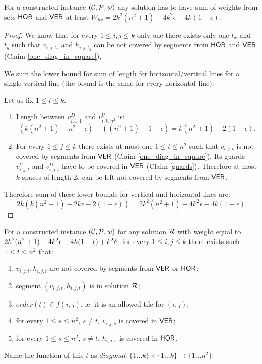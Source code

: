 \begin{lemma}
\label{vertical_horizontal_sum}
For a constructed instance $(\mathcal{C}, \mathcal{P}, w)$
any solution has to have sum of weights from sets $\mathsf{HOR}$ and $\mathsf{VER}$ at least
$W_{hv} = 2k^2(n^2+1) -4k^2\epsilon -4k(1-\epsilon)$.
\end{lemma}

\begin{proof}
We know that for every $1 \le i,j \le k$
only one there exists only one $t_x$ and $t_y$ such that
$v_{i,j,t_x}$ and $h_{i,j,t_y}$
can be not covered by
segments from $\mathsf{HOR}$ and $\mathsf{VER}$ (Claim \ref{one_diag_in_square}),


We sum the lower bound for sum of length for horizontal/vertical
lines for a single vertical line
(the bound is the same for every horizontal line).

Let us fix $1 \le i \le k$.

\begin{enumerate}[label={(\arabic*)}]
\item Length between $v^D_{i, 1, 1}$ and $v^U_{i, k, n^2}$ is:
$$(k(n^2+1) + n^2 +\epsilon) - ((n^2+1)+1 -\epsilon) = k(n^2+1) - 2(1 - \epsilon).$$

\item For every $1 \le j \le k$ there exists at most one $1 \le t \le n^2$
such that $v_{i,j,t}$ is not covered by segments from $\mathsf{VER}$
(Claim \ref{one_diag_in_square}).
Its guards $v^U_{i,j,t}$ and $v^D_{i,j,t}$
have to be covered in $\mathsf{VER}$ (Claim \ref{guards}).
Therefore at most $k$ spaces of length $2\epsilon$ can be left
not covered by segments from $\mathsf{VER}$.

\end{enumerate}
Therefore sum of these lower bounds for vertical and horizontal lines are:
$$2k(k(n^2+1) -2k\epsilon -2(1-\epsilon)) = 2k^2(n^2+1) -4k^2\epsilon -4k(1-\epsilon)$$
\end{proof}

\begin{lemma}
\label{diag_correct}
For a constructed instance $(\mathcal{C}, \mathcal{P}, w)$
for any solution $\mathcal{R}$ with weight equal to $2k^2(n^2+1) - 4k^2\epsilon -4k(1-\epsilon) +k^2\delta$,
for every $1 \le i,j \le k$
there exists such $1 \le t \le n^2$ that:
\begin{enumerate}[label={(\arabic*)}]
\item $v_{i,j,t}, h_{i,j,t}$ are not covered by segments from $\mathsf{VER}$ or $\mathsf{HOR}$;
\item segment $(v_{i,j,t}, h_{i,j,t})$ is in solution $\mathcal{R}$;
\item $order(t) \in f(i,j)$, ie. it is an allowed tile for $(i,j)$;
\item for every $1 \le s\le n^2$, $s \neq t$, $v_{i,j,s}$ is covered in $\mathsf{VER}$;
\item for every $1 \le s\le n^2$, $s \neq t$, $h_{i,j,s}$ is covered in $\mathsf{HOR}$.
\end{enumerate}
Name the function of this $t$ as
$diagonal : \{1 \ldots k\} \times \{1 \ldots k\} \rightarrow \{1 \ldots n^2\}$.
\end{lemma}


